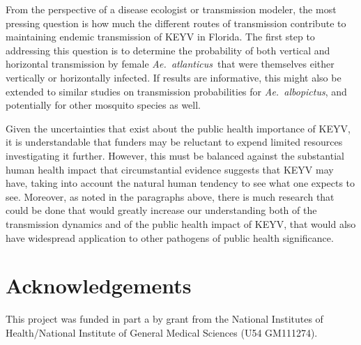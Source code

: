 \documentclass[12pt]{article}
\newcommand{\alb}{\textit{Ae.\ albopictus}}
\newcommand{\atl}{\textit{Ae.\ atlanticus}}
\begin{document}
        From the perspective of a disease ecologist or transmission modeler, the most pressing question is how much the different routes of transmission contribute to maintaining endemic transmission of KEYV in Florida. The first step to addressing this question is to determine the probability of both vertical and horizontal transmission by female \atl\ that were themselves either vertically or horizontally infected. If results are informative, this might also be extended to similar studies on transmission probabilities for \alb, and potentially for other mosquito species as well.

        Given the uncertainties that exist about the public health importance of KEYV, it is understandable that funders may be reluctant to expend limited resources investigating it further. However, this must be balanced against the substantial human health impact that circumstantial evidence suggests that KEYV may have, taking into account the natural human tendency to see what one expects to see. Moreover, as noted in the paragraphs above, there is much research that could be done that would greatly increase our understanding both of the transmission dynamics and of the public health impact of KEYV, that would also have widespread application to other pathogens of public health significance.
\section*{Acknowledgements}
This project was funded in part a by grant from the National Institutes of Health/National Institute of General Medical Sciences (U54 GM111274).
    \printbibliography{}
\end{document}
